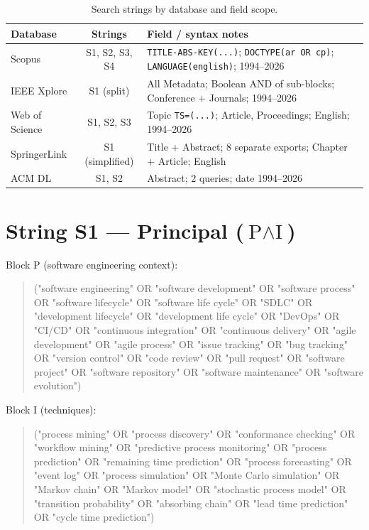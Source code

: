 \begin{table}[htbp]
\centering
\caption{Search strings by database and field scope.}
\label{tab:app-strings}
\small
\setlength{\tabcolsep}{4pt}
\begin{tabular}{p{2.4cm} c p{9.0cm}}
\toprule
\textbf{Database} & \textbf{Strings} & \textbf{Field / syntax notes} \\
\midrule
Scopus       & S1, S2, S3, S4 & \texttt{TITLE-ABS-KEY(...)};
                                  \texttt{DOCTYPE(ar OR cp)};
                                  \texttt{LANGUAGE(english)};
                                  1994--2026 \\
IEEE Xplore  & S1 (split)     & All Metadata; Boolean AND of sub-blocks;
                                  Conference + Journals; 1994--2026 \\
Web of Science & S1, S2, S3   & Topic \texttt{TS=(...)}; Article, Proceedings;
                                  English; 1994--2026 \\
SpringerLink & S1 (simplified)& Title + Abstract; 8 separate exports;
                                  Chapter + Article; English \\
ACM DL       & S1, S2         & Abstract; 2 queries; date 1994--2026 \\
\bottomrule
\end{tabular}
\end{table}

\section{String S1 — Principal ($\text{P} \wedge \text{I}$)}
\label{app:slr-s1}

Block P (software engineering context):

\begin{quote}
\small\ttfamily
("software engineering" OR "software development" OR "software process"
OR "software lifecycle" OR "software life cycle" OR "SDLC" OR "development
lifecycle" OR "development life cycle" OR "DevOps" OR "CI/CD" OR
"continuous integration" OR "continuous delivery" OR "agile development"
OR "agile process" OR "issue tracking" OR "bug tracking" OR "version
control" OR "code review" OR "pull request" OR "software project"
OR "software repository" OR "software maintenance" OR "software
evolution")
\end{quote}

Block I (techniques):

\begin{quote}
\small\ttfamily
("process mining" OR "process discovery" OR "conformance checking" OR
"workflow mining" OR "predictive process monitoring" OR "process prediction"
OR "remaining time prediction" OR "process forecasting" OR "event log" OR
"process simulation" OR "Monte Carlo simulation" OR "Markov chain" OR
"Markov model" OR "stochastic process model" OR "transition probability"
OR "absorbing chain" OR "lead time prediction" OR "cycle time prediction")
\end{quote}

